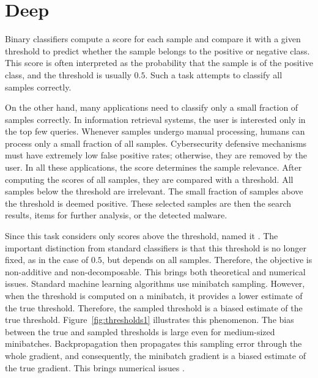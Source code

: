 \chapter{Deep}

Binary classifiers compute a score for each sample and compare it with a given threshold to predict whether the sample belongs to the positive or negative class. This score is often interpreted as the probability that the sample is of the positive class, and the threshold is usually $0.5$. Such a task attempts to classify all samples correctly.

On the other hand, many applications need to classify only a small fraction of samples correctly. In information retrieval systems, the user is interested only in the top few queries. Whenever samples undergo manual processing, humans can process only a small fraction of all samples. Cybersecurity defensive mechanisms must have extremely low false positive rates; otherwise, they are removed by the user. In all these applications, the score determines the sample relevance. After computing the scores of all samples, they are compared with a threshold. All samples below the threshold are irrelevant. The small fraction of samples above the threshold is deemed positive. These selected samples are then the search results, items for further analysis, or the detected malware.

Since this task considers only scores above the threshold, \cite{boyd2012accuracy} named it \AccatTop. The important distinction from standard classifiers is that this threshold is no longer fixed, as in the case of $0.5$, but depends on all samples. Therefore, the objective is non-additive and non-decomposable. This brings both theoretical and numerical issues. Standard machine learning algorithms use minibatch sampling. However, when the threshold is computed on a minibatch, it provides a lower estimate of the true threshold. Therefore, the sampled threshold is a biased estimate of the true threshold. Figure~\ref{fig:thresholds1} illustrates this phenomenon. The bias between the true and sampled thresholds is large even for medium-sized minibatches. Backpropagation then propagates this sampling error through the whole gradient, and consequently, the minibatch gradient is a biased estimate of the true gradient. This brings numerical issues \cite{bottou2018optimization}.

